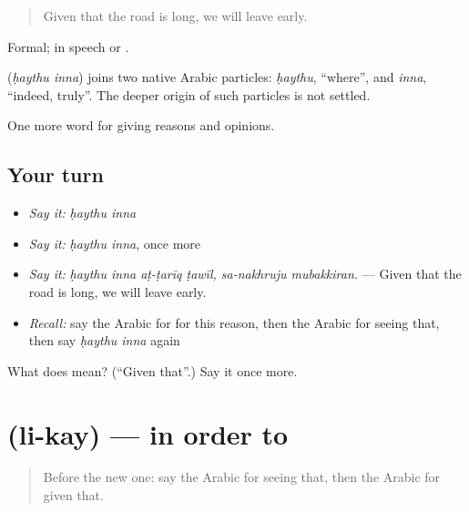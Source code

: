 \begin{quote}
Given that the road is long, we will leave early.
\end{quote}

Formal; in speech   or .

\begin{cousinweb}
\textbf{ } (\emph{ḥaythu inna}) joins two native Arabic particles: \emph{ḥaythu}, \textquotedblleft{}where\textquotedblright{}, and \emph{inna}, \textquotedblleft{}indeed, truly\textquotedblright{}. The deeper origin of such particles is not settled.
\end{cousinweb}

\begin{grammarlens}[title={What you've built}]
One more word for giving reasons and opinions.
\end{grammarlens}

\subsection*{Your turn}
\begin{itemize}
\raggedright
  \item \emph{Say it:} \emph{ḥaythu inna}
  \item \emph{Say it:} \emph{ḥaythu inna}, once more
  \item \emph{Say it:} \emph{ḥaythu inna aṭ-ṭarīq ṭawīl, sa-nakhruju mubakkiran.} — Given that the road is long, we will leave early.
  \item \emph{Recall:} say the Arabic for for this reason, then the Arabic for seeing that, then say \emph{ḥaythu inna} again
\end{itemize}

\begin{tcolorbox}[breakable,colback=teal!4,colframe=teal!35!black,title={Before you move on}]
What does   mean? (\textquotedblleft{}Given that\textquotedblright{}.) Say it once more.
\end{tcolorbox}
\section[\texorpdfstring{\ar{لكي} (li-kay)}{لكي (li-kay)}]{ (li-kay) — in order to}

\label{lesson:AR-C374-li-kay}



\begin{quote}
Before the new one: say the Arabic for seeing that, then the Arabic for given that.
\end{quote}

